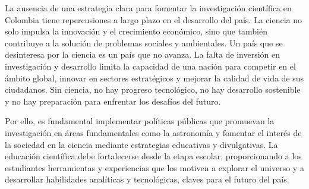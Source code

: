 La ausencia de una estrategia clara para fomentar la investigación científica en
Colombia tiene repercusiones a largo plazo en el desarrollo del país. La ciencia
no solo impulsa la innovación y el crecimiento económico, sino que también
contribuye a la solución de problemas sociales y ambientales. Un país que se
desinteresa por la ciencia es un país que no avanza. La falta de inversión en
investigación y desarrollo limita la capacidad de una nación para competir en el
ámbito global, innovar en sectores estratégicos y mejorar la calidad de vida de
sus ciudadanos. Sin ciencia, no hay progreso tecnológico, no hay desarrollo
sostenible y no hay preparación para enfrentar los desafíos del futuro.

Por ello, es fundamental implementar políticas públicas que promuevan la
investigación en áreas fundamentales como la astronomía y fomentar el interés de
la sociedad en la ciencia mediante estrategias educativas y divulgativas. La
educación científica debe fortalecerse desde la etapa escolar, proporcionando
a los estudiantes herramientas y experiencias que los motiven a explorar el
universo y a desarrollar habilidades analíticas y tecnológicas, claves para el
futuro del país.
